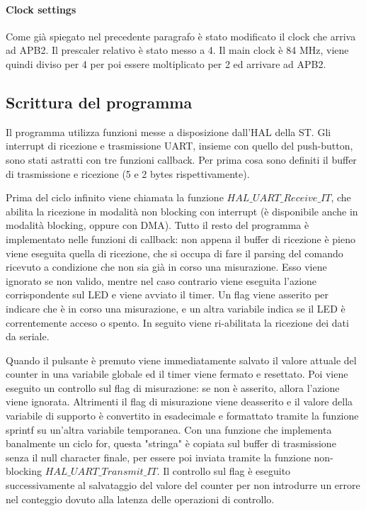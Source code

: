 \documentclass[a4paper]{article}
\begin{document}
		\paragraph{Clock settings}
		Come già spiegato nel precedente paragrafo è stato modificato il clock che arriva ad APB2. Il prescaler relativo è stato messo a 4. Il main clock è 84 MHz, viene quindi diviso per 4 per poi essere moltiplicato per 2 ed arrivare ad APB2.
	\subsection{Scrittura del programma}
		Il programma utilizza funzioni messe a disposizione dall'HAL della ST. Gli interrupt di ricezione e trasmissione UART, insieme con quello del push-button, sono stati astratti con tre funzioni callback.
		Per prima cosa sono definiti il buffer di trasmissione e ricezione (5 e 2 bytes rispettivamente).
		
		Prima del ciclo infinito viene chiamata la funzione \textbf{$HAL\_UART\_Receive\_IT$}, che abilita la ricezione in modalità non blocking con interrupt (è disponibile anche in modalità blocking, oppure con DMA).
		Tutto il resto del programma è implementato nelle funzioni di callback: non appena il buffer di ricezione è pieno viene eseguita quella di ricezione, che si occupa di fare il parsing del comando ricevuto a condizione che non sia già in corso una misurazione. Esso viene ignorato se non valido, mentre nel caso contrario viene eseguita l'azione corrispondente sul LED e viene avviato il timer. Un flag viene asserito per indicare che è in corso una misurazione, e un altra variabile indica se il LED è correntemente acceso o spento. In seguito viene ri-abilitata la ricezione dei dati da seriale.

		Quando il pulsante è premuto viene immediatamente salvato il valore attuale del counter in una variabile globale ed il timer viene fermato e resettato. Poi viene eseguito un controllo sul flag di misurazione: se non è asserito, allora l'azione viene ignorata. Altrimenti il flag di misurazione viene deasserito e il valore della variabile di supporto è convertito in esadecimale e formattato tramite la funzione sprintf su un'altra variabile temporanea. Con una funzione che implementa banalmente un ciclo for, questa "stringa" è copiata sul buffer di trasmissione senza il null character finale, per essere poi inviata tramite la funzione non-blocking \textbf{$HAL\_UART\_Transmit\_IT$}.
		Il controllo sul flag è eseguito successivamente al salvataggio del valore del counter per non introdurre un errore nel conteggio dovuto alla latenza delle operazioni di controllo.
\end{document}
